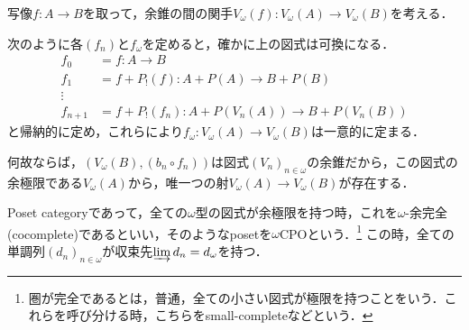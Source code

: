 \documentclass[uplatex, 12pt, dvipdfmx]{jsarticle}
\begin{document}
\begin{example}
    写像$f:A\to B$を取って，余錐の間の関手$V_\omega(f):V_\omega(A)\to V_\omega(B)$を考える．
    \begin{center}
    \end{center}
    次のように各$(f_n)$と$f_\omega$を定めると，確かに上の図式は可換になる．
    \begin{align*}
        f_0 &= f:A\to B \\
        f_1 &= f+P_!(f) : A+P(A) \to B+P(B) \\
        \vdots &{} \\
        f_{n+1} &= f+P_!(f_n) : A+P(V_n(A)) \to B+P(V_n(B))
    \end{align*}
    と帰納的に定め，これらにより$f_\omega:V_\omega(A)\to V_\omega(B)$は一意的に定まる．

    何故ならば，$(V_\omega(B),(b_n\circ f_n))$は図式$(V_n)_{n\in\omega}$の余錐だから，この図式の余極限である$V_\omega(A)$から，唯一つの射$V_\omega(A)\to V_\omega(B)$が存在する．
\end{example}

\vspace{3cm}

\begin{example}
    Poset categoryであって，全ての$\omega$型の図式が余極限を持つ時，これを$\omega$-余完全(cocomplete)であるといい，そのようなposetを$\omega$CPOという．\footnote{圏が完全であるとは，普通，全ての小さい図式が極限を持つことをいう．これらを呼び分ける時，こちらをsmall-completeなどという．}
    この時，全ての単調列$(d_n)_{n\in\omega}$が収束先$\varinjlim d_n=d_\omega$を持つ．
\end{example}
\end{document}
